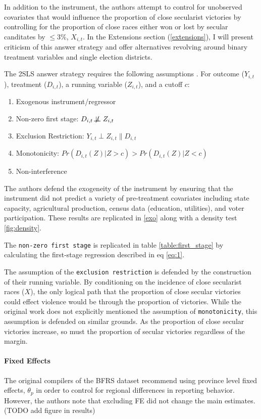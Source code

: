 \documentclass{scrartcl}
\begin{document}
In addition to the instrument, the authors attempt to control for unobserved covariates that would influence the proportion of close secularist victories by controlling for the proportion of close races either won or lost by secular canditates by $\leq 3\%$, $X_{i,t}$.
In the Extensions section (\ref{extensions}), I will present criticism of this answer strategy and offer alternatives revolving around binary treatment variables and single election districts.

The 2SLS answer strategy requires the following assumptions \cite{morgan_2015, Imbens_2008, Cattaneo_2019}.
For outcome ($Y_{i,t}$), treatment ($D_{i,t}$), a running variable ($Z_{i,t}$), and a cutoff $c$:
\begin{enumerate}
\item{Exogenous instrument/regressor}
\item{Non-zero first stage: $D_{i,t} \not\!\perp\!\!\!\perp Z_{i,t}$}
\item{Exclusion Restriction: $Y_{i,t} \perp Z_{i,t} \| D_{i,t}$}
\item{Monotonicity}: $Pr(D_{i,t}(Z) | Z > c) > Pr(D_{i,t}(Z) | Z < c)$
\item{Non-interference}
\end{enumerate}

The authors defend the exogeneity of the instrument by ensuring that the instrument did not predict a variety of pre-treatment covariates including state capacity, agricultural production, census data (education, utilities), and voter participation. These results are replicated in \ref{exo} along with a density test \ref{fig:density}.

The \texttt{non-zero first stage} is replicated in table \ref{table:first_stage} by calculating the first-stage regression described in eq \ref{eq:1}.

The assumption of the \texttt{exclusion restriction} is defended by the construction of their running variable.
By conditioning on the incidence of close secularist races ($X$), the only logical path that the proportion of close secular victories could effect violence would be through the proportion of victories. 
While the original work does not explicitly mentioned the assumption of \texttt{monotonicity}, this assumption is defended on similar grounds. As the proportion of close secular victories increase, so must the proportion of secular victories regardless of the margin.

\paragraph{Fixed Effects}
The original compilers of the BFRS dataset recommend using province level fixed effects, $\theta_p$ in order to control for regional differences in reporting behavior.
However, the authors note that excluding FE did not change the main estimates. (TODO add figure in results)
\end{document}
